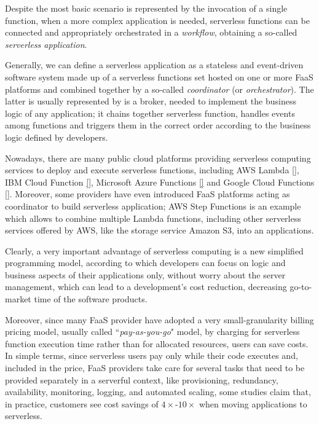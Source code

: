 \documentclass[12pt,a4paper]{report}
\newcommand{\ItalicQuotMark}[1]{``\textit{#1}"}
\begin{document}
Despite the most basic scenario is represented by the invocation of a single function, when a more complex application is needed, serverless functions can be connected and appropriately orchestrated in a \textit{workflow}, obtaining a so-called \textit{serverless application}.

Generally, we can define a serverless application as a stateless and event-driven software system made up of a serverless functions set hosted on one or more FaaS platforms and combined together by a so-called \textit{coordinator} (or \textit{orchestrator}). The latter is usually represented by is a broker, needed to implement the business logic of any application; it chains together serverless function, handles events among functions and triggers them in the correct order according to the business logic defined by developers. 

Nowadays, there are many public cloud platforms providing serverless computing services to deploy and execute serverless functions, including AWS Lambda \ref{}, IBM Cloud Function \ref{}, Microsoft Azure Functions \ref{} and Google Cloud Functions \ref{}. Moreover, some providers have even introduced FaaS platforms acting as coordinator to build serverless application; AWS Step Functions is an example which allows to combine multiple Lambda functions, including other serverless services offered by AWS, like the storage service Amazon S3, into an applications.  

Clearly, a very important advantage of serverless computing is a new simplified programming model, according to which developers can focus on logic and business aspects of their applications only, without worry about the server management, which can lead to a development's cost reduction, decreasing go-to-market time of the software products.

Moreover, since many FaaS provider have adopted a very small-granularity billing pricing model, usually called \ItalicQuotMark{pay-as-you-go} model, by charging for serverless function execution time rather than for allocated resources, users can save costs. In simple terms, since serverless users pay only while their code executes and, included in the price, FaaS providers take care for several tasks that need to be provided separately in a serverful context, like  provisioning, redundancy, availability, monitoring, logging, and automated scaling, some studies claim that, in practice, customers see cost savings of $4\times$-$10\times$ when moving applications to serverless.
\end{document}
